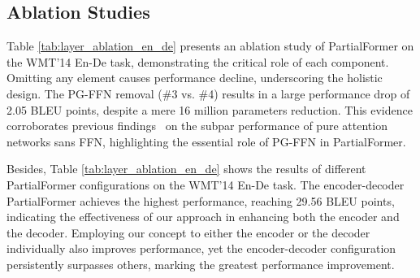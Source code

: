 \documentclass[11pt]{article}
\begin{document}
\subsection{Ablation Studies}

Table \ref{tab:layer_ablation_en_de} presents an ablation study of PartialFormer on the WMT'14 En-De task, demonstrating the critical role of each component. Omitting any element causes performance decline, underscoring the holistic design. The PG-FFN removal (\#3 vs. \#4) results in a large performance drop of 2.05 BLEU points, despite a mere 16 million parameters reduction. This evidence corroborates previous findings~\cite{Dong2021PureAttention} on the subpar performance of pure attention networks sans FFN, highlighting the essential role of PG-FFN in PartialFormer.





Besides, Table \ref{tab:layer_ablation_en_de} shows the results of different PartialFormer configurations on the WMT'14 En-De task. The encoder-decoder PartialFormer achieves the highest performance, reaching 29.56 BLEU points, indicating the effectiveness of our approach in enhancing both the encoder and the decoder. Employing our concept to either the encoder or the decoder individually also improves performance, yet the encoder-decoder configuration persistently surpasses others, marking the greatest performance improvement.




\begin{table}[t!]
    \centering
    \renewcommand{\arraystretch}{1}
\centering
\small
\setlength{\tabcolsep}{1.5pt}
    \caption{MACs denote the multiplication-addition operations. We compute
them via 20 source and target tokens following \citet{Mehta2021Delight}.}
    \label{tab:Macs_comparison}
\end{table}
\end{document}
